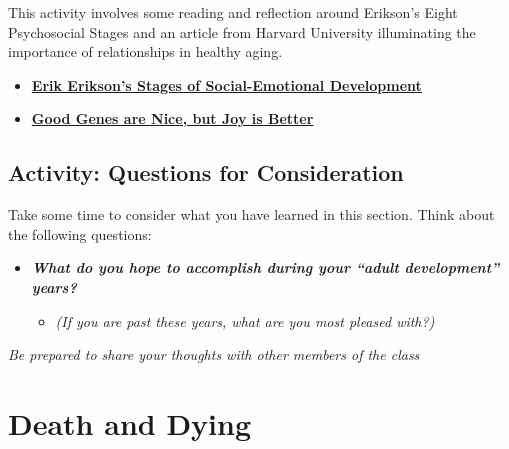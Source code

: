 \documentclass[
]{book}
\providecommand{\tightlist}{%
  \setlength{\itemsep}{0pt}\setlength{\parskip}{0pt}}
\begin{document}
\begin{reflect}
This activity involves some reading and reflection around Erikson's Eight Psychosocial Stages and an article from Harvard University illuminating the importance of relationships in healthy aging.

\begin{itemize}
\tightlist
\item
  \href{https://childdevelopmentinfo.com/child-development/erickson/\#gs.d8mpcv}{\textbf{Erik Erikson's Stages of Social-Emotional Development}}\\
\item
  \href{https://news.harvard.edu/gazette/story/2017/04/over-nearly-80-years-harvard-study-has-been-showing-how-to-live-a-healthy-and-happy-life/}{\textbf{Good Genes are Nice, but Joy is Better}}
\end{itemize}
\end{reflect}

\hypertarget{activity-questions-for-consideration-4}{%
\subsection*{Activity: Questions for Consideration}\label{activity-questions-for-consideration-4}}

\begin{reflect}
Take some time to consider what you have learned in this section. Think about the following questions:

\begin{itemize}
\tightlist
\item
  \textbf{\emph{What do you hope to accomplish during your ``adult development'' years?}}

  \begin{itemize}
  \tightlist
  \item
    \emph{(If you are past these years, what are you most pleased with?)}
  \end{itemize}
\end{itemize}

\emph{Be prepared to share your thoughts with other members of the class}
\end{reflect}

\hypertarget{death-and-dying}{%
\section{Death and Dying}\label{death-and-dying}}
\end{document}
